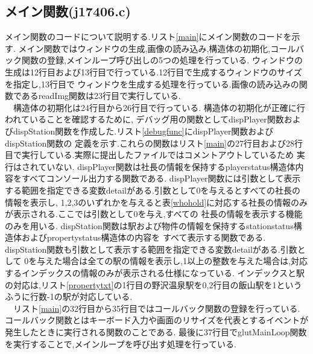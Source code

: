 \documentclass[a4j]{jarticle}
\begin{document}
  \subsection{メイン関数(j17406.c)}
メイン関数のコードについて説明する.リスト\ref{main}にメイン関数のコードを示す.
メイン関数ではウィンドウの生成,画像の読み込み,構造体の初期化,コールバック関数の登録,メインループ呼び出しの5つの処理を行っている.
ウィンドウの生成は12行目および13行目で行っている.12行目で生成するウィンドウのサイズを指定し,13行目で
ウィンドウを生成する処理を行っている.画像の読み込みの関数であるreadImg関数は23行目で実行している.\\
　構造体の初期化は24行目から26行目で行っている.
構造体の初期化が正確に行われていることを確認するために,
デバッグ用の関数としてdispPlayer関数およびdispStation関数を作成した.リスト\ref{debugfunc}にdispPlayer関数およびdispStation関数の
定義を示す.これらの関数はリスト\ref{main}の27行目および28行目で実行している.実際に提出したファイルではコメントアウトしているため
実行はされていない. dispPlayer関数は社長の情報を保持するplayerstatus構造体内容をすべてコンソール出力する関数である.
dispPlayer関数には引数として表示する範囲を指定できる変数detailがある.引数として0を与えるとすべての社長の情報を表示し,
1,2,3のいずれかを与えると表\ref{whohold}に対応する社長の情報のみが表示される.ここでは引数として0を与え,すべての
社長の情報を表示する機能のみを用いる. dispStation関数は駅および物件の情報を保持するstationstatus構造体およびpropertystatus構造体の内容を
すべて表示する関数である. dispStation関数も引数として表示する範囲を指定できる変数detailがある.引数として
0を与えた場合は全ての駅の情報を表示し,1以上の整数を与えた場合は,対応するインデックスの情報のみが表示される仕様になっている.
インデックスと駅の対応は,リスト\ref{propertytxt}の1行目の野沢温泉駅を0,2行目の飯山駅を1というふうに行数-1の駅が対応している.\\
　リスト\ref{main}の32行目から35行目ではコールバック関数の登録を行っている.
コールバック関数とはキーボード入力や画面のリサイズを代表とするイベントが発生したときに実行される関数のことである. 
最後に37行目でglutMainLoop関数を実行することで,メインループを呼び出す処理を行っている.
\end{document}
